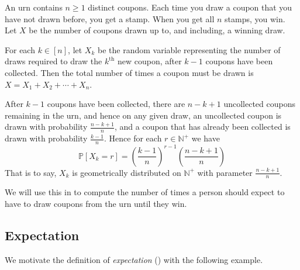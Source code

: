 \begin{example}
\label{exCoinCollectorSetUp}
An urn contains $n \ge 1$ distinct coupons. Each time you draw a coupon that you have not drawn before, you get a stamp. When you get all $n$ stamps, you win. Let $X$ be the number of coupons drawn up to, and including, a winning draw.

For each $k \in [n]$, let $X_k$ be the random variable representing the number of draws required to draw the $k^{\text{th}}$ new coupon, after $k-1$ coupons have been collected. Then the total number of times a coupon must be drawn is $X = X_1+X_2+\cdots+X_n$.

After $k-1$ coupons have been collected, there are $n-k+1$ uncollected coupons remaining in the urn, and hence on any given draw, an uncollected coupon is drawn with probability $\frac{n-k+1}{n}$, and a coupon that has already been collected is drawn with probability $\frac{k-1}{n}$. Hence for each $r \in \mathbb{N}^+$ we have
\[ \mathbb{P}[X_k=r] = \left( \frac{k-1}{n} \right)^{r-1} \left( \frac{n-k+1}{n} \right) \]
That is to say, $X_k$ is geometrically distributed on $\mathbb{N}^+$ with parameter $\frac{n-k+1}{n}$.

We will use this in  to compute the number of times a person should expect to have to draw coupons from the urn until they win.
\end{example}

\subsection*{Expectation}

We motivate the definition of \textit{expectation} () with the following example.

